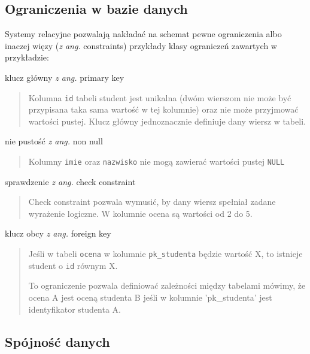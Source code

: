 \documentclass[a4paper]{article}
\begin{document}
\subsection{Ograniczenia w bazie danych%
  \label{ograniczenia-w-bazie-danych}%
}

Systemy relacyjne pozwalają nakładać na schemat pewne ograniczenia albo inaczej
więzy (\emph{z ang.} constraints) przykłady klasy ograniczeń zawartych w przykładzie:

klucz główny \emph{z ang.} primary key
%
\begin{quote}

Kolumna \texttt{id} tabeli student jest unikalna (dwóm wierszom nie może być
przypisana taka sama wartość w tej kolumnie) oraz nie może przyjmować
wartości pustej. Klucz główny jednoznacznie definiuje dany wiersz w tabeli.

\end{quote}

nie pustość \emph{z ang.} non null
%
\begin{quote}

Kolumny \texttt{imie} oraz \texttt{nazwisko} nie mogą zawierać wartości pustej \texttt{NULL}

\end{quote}

sprawdzenie \emph{z ang.} check constraint
%
\begin{quote}

Check constraint pozwala wymusić, by dany wiersz spełniał zadane wyrażenie
logiczne. W kolumnie ocena są wartości od 2 do 5.

\end{quote}

klucz obcy \emph{z ang.} foreign key
%
\begin{quote}

Jeśli w tabeli \texttt{ocena} w kolumnie \texttt{pk\_studenta} będzie
wartość X, to istnieje student o \texttt{id} równym X.

To ograniczenie pozwala definiować zależności między tabelami mówimy, że
ocena A jest oceną studenta B jeśli w kolumnie 'pk\_studenta' jest
identyfikator studenta A.

\end{quote}


\subsection{Spójność danych%
  \label{spojnosc-danych}%
}
\end{document}
